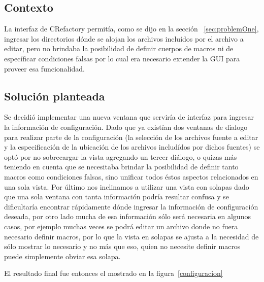 \documentclass[a4paper,oneside,12pt]{article}
\begin{document}
\subsection{Contexto}
La interfaz de CRefactory permit\'ia, como se dijo en la secci\'on ~\ref{sec:problemOne}, ingresar los directorios d\'onde se alojan los archivos inclu\'idos por el archivo a editar, pero no brindaba la posibilidad de definir cuerpos de macros ni de espec\'ificar condiciones falsas por lo cual era necesario extender la GUI para proveer esa funcionalidad.

\subsection{Soluci\'on planteada}
Se decidi\'o implementar una nueva ventana que servir\'ia de interfaz para ingresar la informaci\'on de configuraci\'on. Dado que ya exist\'ian dos ventanas de dialogo para realizar parte de la configuraci\'on (la selecci\'on de los archivos fuente a editar y la especificaci\'on de la ubicaci\'on de los archivos includ\'idos por dichos fuentes) se opt\'o por no sobrecargar la vista agregando un tercer di\'alogo, o quizas m\'as teniendo en cuenta que se necesitaba brindar la posibilidad de definir tanto macros como condiciones falsas, sino unificar todos \'estos aspectos relacionados en una sola vista. Por \'ultimo nos inclinamos a utilizar una vista  con solapas dado que una sola ventana con tanta informaci\'on podr\'ia resultar confusa y se dificultar\'ia encontrar r\'apidamente d\'onde ingresar la informaci\'on de configuraci\'on deseada, por otro lado mucha de esa informaci\'on s\'olo ser\'a necesaria en algunos casos, por ejemplo muchas veces se podr\'a editar un archivo donde no fuera necesario definir macros, por lo que la vista en solapas se ajusta a la necesidad de s\'olo mostrar lo necesario y no m\'as que eso, quien no necesite definir macros puede simplemente obviar esa solapa.

El resultado final fue entonces el mostrado en la figura~\ref{configuracion}
\end{document}
